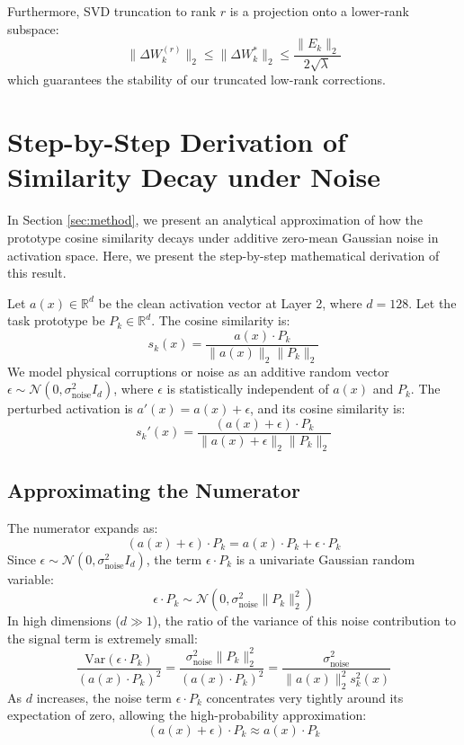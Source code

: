 \documentclass{article}
\theoremstyle{plain}
\theoremstyle{definition}
\theoremstyle{remark}
\begin{document}
Furthermore, SVD truncation to rank $r$ is a projection onto a lower-rank subspace:
\begin{equation}
    \|\Delta W_k^{(r)}\|_2 \le \|\Delta W_k^*\|_2 \le \frac{\|E_k\|_2}{2\sqrt{\lambda}}
\end{equation}
which guarantees the stability of our truncated low-rank corrections.

\section{Step-by-Step Derivation of Similarity Decay under Noise}
\label{app:noise_decay}
In Section \ref{sec:method}, we present an analytical approximation of how the prototype cosine similarity decays under additive zero-mean Gaussian noise in activation space. Here, we present the step-by-step mathematical derivation of this result.

Let $a(x) \in \mathbb{R}^d$ be the clean activation vector at Layer 2, where $d = 128$. Let the task prototype be $P_k \in \mathbb{R}^d$. The cosine similarity is:
\begin{equation}
    s_k(x) = \frac{a(x) \cdot P_k}{\|a(x)\|_2 \|P_k\|_2}
\end{equation}
We model physical corruptions or noise as an additive random vector $\epsilon \sim \mathcal{N}(0, \sigma_{\text{noise}}^2 I_d)$, where $\epsilon$ is statistically independent of $a(x)$ and $P_k$. The perturbed activation is $a'(x) = a(x) + \epsilon$, and its cosine similarity is:
\begin{equation}
    s_k'(x) = \frac{(a(x) + \epsilon) \cdot P_k}{\|a(x) + \epsilon\|_2 \|P_k\|_2}
\end{equation}

\subsection{Approximating the Numerator}
The numerator expands as:
\begin{equation}
    (a(x) + \epsilon) \cdot P_k = a(x) \cdot P_k + \epsilon \cdot P_k
\end{equation}
Since $\epsilon \sim \mathcal{N}(0, \sigma_{\text{noise}}^2 I_d)$, the term $\epsilon \cdot P_k$ is a univariate Gaussian random variable:
\begin{equation}
    \epsilon \cdot P_k \sim \mathcal{N}\left( 0, \sigma_{\text{noise}}^2 \|P_k\|_2^2 \right)
\end{equation}
In high dimensions ($d \gg 1$), the ratio of the variance of this noise contribution to the signal term is extremely small:
\begin{equation}
    \frac{\text{Var}(\epsilon \cdot P_k)}{(a(x) \cdot P_k)^2} = \frac{\sigma_{\text{noise}}^2 \|P_k\|_2^2}{(a(x) \cdot P_k)^2} = \frac{\sigma_{\text{noise}}^2}{\|a(x)\|_2^2 s_k^2(x)}
\end{equation}
As $d$ increases, the noise term $\epsilon \cdot P_k$ concentrates very tightly around its expectation of zero, allowing the high-probability approximation:
\begin{equation}
    (a(x) + \epsilon) \cdot P_k \approx a(x) \cdot P_k
\end{equation}
\end{document}
